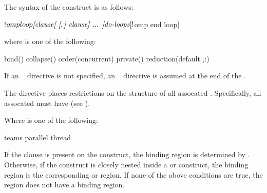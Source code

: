 \begin{fortranspecific}
The syntax of the  construct is as follows:

\begin{ompfPragma}
!$omp loop \plc{[clause[ [},\plc{] clause] ... ]}
   \plc{do-loops}
[!$omp end loop]
\end{ompfPragma}

\begin{samepage}
where  is one of the following:

\begin{indentedcodelist}
bind()
collapse()
order(concurrent)
private()
reduction(\plc{[}default ,\plc{]reduction-identifier }:)
\end{indentedcodelist}
\end{samepage}

If an ~ directive is not specified, an
  ~ directive is assumed at the end of the
.

The  directive places restrictions on the structure of all
assocated . Specifically, all assocated  must
have  (see ).
\end{fortranspecific}

Where  is one of the following:
\begin{indentedcodelist}
  teams
  parallel
  thread
\end{indentedcodelist}


%

\binding

If the  clause is present on the construct, the binding region is
determined by . Otherwise, if the  construct is closely
nested inside a  or  construct, the binding region
is the corresponding  or  region. If none of the
above conditions are true, the  region does not have a binding region.

